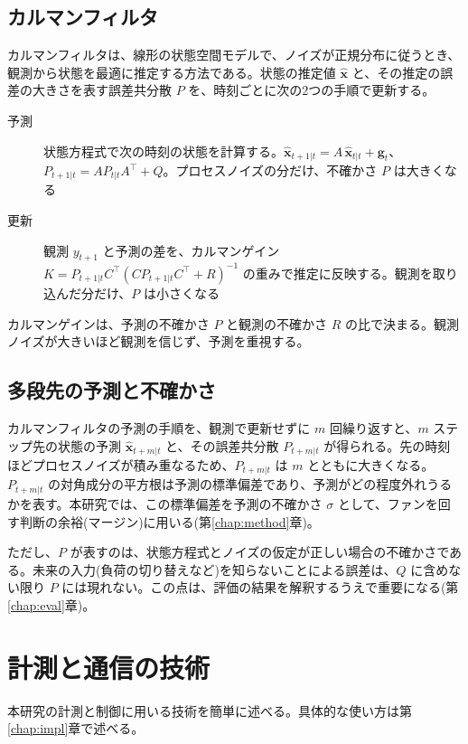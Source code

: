 \subsection{カルマンフィルタ}
カルマンフィルタ\cite{kalman1960}は、線形の状態空間モデルで、ノイズが正規分布に従うとき、観測から状態を最適に推定する方法である。状態の推定値 $\hat{\bm{x}}$ と、その推定の誤差の大きさを表す誤差共分散 $P$ を、時刻ごとに次の2つの手順で更新する。
\begin{description}
  \item[予測] 状態方程式で次の時刻の状態を計算する。$\hat{\bm{x}}_{t+1|t} = A\,\hat{\bm{x}}_{t|t} + \bm{g}_t$、$P_{t+1|t} = A P_{t|t} A^\top + Q$。プロセスノイズの分だけ、不確かさ $P$ は大きくなる
  \item[更新] 観測 $y_{t+1}$ と予測の差を、カルマンゲイン $K = P_{t+1|t} C^\top (C P_{t+1|t} C^\top + R)^{-1}$ の重みで推定に反映する。観測を取り込んだ分だけ、$P$ は小さくなる
\end{description}
カルマンゲインは、予測の不確かさ $P$ と観測の不確かさ $R$ の比で決まる。観測ノイズが大きいほど観測を信じず、予測を重視する。

\subsection{多段先の予測と不確かさ}
カルマンフィルタの予測の手順を、観測で更新せずに $m$ 回繰り返すと、$m$ ステップ先の状態の予測 $\hat{\bm{x}}_{t+m|t}$ と、その誤差共分散 $P_{t+m|t}$ が得られる。先の時刻ほどプロセスノイズが積み重なるため、$P_{t+m|t}$ は $m$ とともに大きくなる。$P_{t+m|t}$ の対角成分の平方根は予測の標準偏差であり、予測がどの程度外れうるかを表す。本研究では、この標準偏差を予測の不確かさ $\sigma$ として、ファンを回す判断の余裕(マージン)に用いる(第\ref{chap:method}章)。

ただし、$P$ が表すのは、状態方程式とノイズの仮定が正しい場合の不確かさである。未来の入力(負荷の切り替えなど)を知らないことによる誤差は、$Q$ に含めない限り $P$ には現れない。この点は、評価の結果を解釈するうえで重要になる(第\ref{chap:eval}章)。

\section{計測と通信の技術}\label{sec:bg-tools}
本研究の計測と制御に用いる技術を簡単に述べる。具体的な使い方は第\ref{chap:impl}章で述べる。

